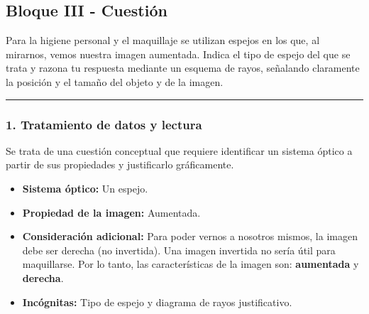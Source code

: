 \newpage
\subsection{Bloque III - Cuestión}
\label{subsec:III_A_2013_jun_ord}

\begin{cajaenunciado}
Para la higiene personal y el maquillaje se utilizan espejos en los que, al mirarnos, vemos nuestra imagen aumentada. Indica el tipo de espejo del que se trata y razona tu respuesta mediante un esquema de rayos, señalando claramente la posición y el tamaño del objeto y de la imagen.
\end{cajaenunciado}
\hrule

\subsubsection*{1. Tratamiento de datos y lectura}
Se trata de una cuestión conceptual que requiere identificar un sistema óptico a partir de sus propiedades y justificarlo gráficamente.
\begin{itemize}
    \item \textbf{Sistema óptico:} Un espejo.
    \item \textbf{Propiedad de la imagen:} Aumentada.
    \item \textbf{Consideración adicional:} Para poder vernos a nosotros mismos, la imagen debe ser derecha (no invertida). Una imagen invertida no sería útil para maquillarse. Por lo tanto, las características de la imagen son: \textbf{aumentada} y \textbf{derecha}.
    \item \textbf{Incógnitas:} Tipo de espejo y diagrama de rayos justificativo.
\end{itemize}

